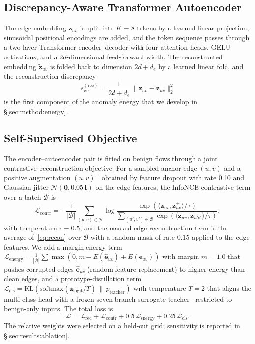 \documentclass{ieeeaccess}
\begin{document}
\subsection{Discrepancy-Aware Transformer Autoencoder}
\label{sec:method:txae}
The edge embedding $\mathbf{z}_{uv}$ is split into $K = 8$ tokens by a
learned linear projection, sinusoidal positional encodings are added, and
the token sequence passes through a two-layer Transformer
encoder--decoder with four attention heads, GELU activations, and a
$2d$-dimensional feed-forward width. The reconstructed embedding
$\tilde{\mathbf{z}}_{uv}$ is folded back to dimension $2d + d_e$ by a
learned linear fold, and the reconstruction discrepancy
\begin{equation}
s_{uv}^{(\mathrm{rec})} = \frac{1}{2d + d_e}\,\|\mathbf{z}_{uv} - \tilde{\mathbf{z}}_{uv}\|_2^2
\label{eq:recon}
\end{equation}
is the first component of the anomaly energy that we develop in
\S\ref{sec:method:energy}.

\subsection{Self-Supervised Objective}
\label{sec:method:objective}
The encoder--autoencoder pair is fitted on benign flows through a
joint contrastive--reconstruction objective. For a sampled anchor edge
$(u,v)$ and a positive augmentation $(u,v)^+$ obtained by feature dropout
with rate 0.10 and Gaussian jitter
$\mathcal{N}(\mathbf{0}, 0.05\,\mathbf{I})$ on the edge features, the
InfoNCE contrastive term over a batch $\mathcal{B}$ is
\begin{equation}
\mathcal{L}_{\mathrm{contr}} = -\frac{1}{|\mathcal{B}|}\sum_{(u,v)\in\mathcal{B}} \log \frac{\exp(\langle \mathbf{z}_{uv}, \mathbf{z}_{uv}^+\rangle/\tau)}{\sum_{(u',v')\in\mathcal{B}} \exp(\langle \mathbf{z}_{uv}, \mathbf{z}_{u'v'}\rangle/\tau)},
\label{eq:contr}
\end{equation}
with temperature $\tau = 0.5$, and the masked-edge reconstruction term is
the average of~\eqref{eq:recon} over $\mathcal{B}$ with a random mask of
rate $0.15$ applied to the edge features. We add a margin-energy term
$\mathcal{L}_{\mathrm{energy}} = \tfrac{1}{|\mathcal{B}|}\sum \max(0, m - E(\hat{\mathbf{e}}_{uv}) + E(\mathbf{e}_{uv}))$
with margin $m = 1.0$ that pushes corrupted edges $\hat{\mathbf{e}}_{uv}$
(random-feature replacement) to higher energy than clean edges, and a
prototype-distillation term
$\mathcal{L}_{\mathrm{cls}} = \mathrm{KL}(\mathrm{softmax}(\mathbf{z}_{\mathrm{logit}}/T)\,\|\,p_{\mathrm{teacher}})$
with temperature $T = 2$ that aligns the multi-class head with a frozen
seven-branch surrogate teacher~\cite{anaedevha2024robustadv} restricted to
benign-only inputs. The total loss is
\begin{equation}
\mathcal{L} = \mathcal{L}_{\mathrm{rec}} + \mathcal{L}_{\mathrm{contr}} + 0.5\,\mathcal{L}_{\mathrm{energy}} + 0.25\,\mathcal{L}_{\mathrm{cls}}.
\label{eq:totalloss}
\end{equation}
The relative weights were selected on a held-out grid; sensitivity is
reported in \S\ref{sec:results:ablation}.
\end{document}
